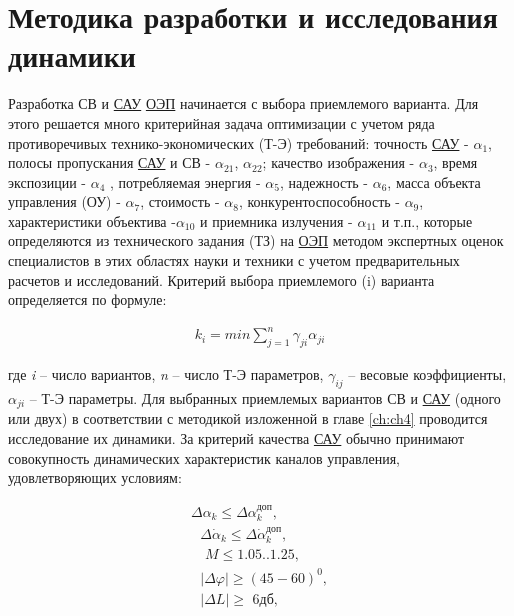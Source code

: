 \section{Методика разработки и исследования динамики} \label{sec:ch2/sec1-}


Разработка СВ и \hyperref[acroSAU]{САУ} \hyperref[acroEOS]{ОЭП} начинается с выбора приемлемого варианта. Для этого решается много критерийная задача оптимизации с учетом ряда противоречивых технико-экономических (Т-Э) требований: точность \hyperref[acroSAU]{САУ} - $\alpha_{1}$, полосы пропускания \hyperref[acroSAU]{САУ} и СВ - $\alpha_{21}$, $\alpha_{22}$; качество изображения - $\alpha_{3}$, время экспозиции - $\alpha_{4}$ , потребляемая энергия - $\alpha_{5}$, надежность - $\alpha_{6}$, масса объекта управления (ОУ) - $\alpha_{7}$, стоимость - $\alpha_{8}$, конкурентоспособность - $\alpha_{9}$, характеристики объектива -$\alpha_{10}$ и приемника излучения - $\alpha_{11}$ и т.п., которые определяются из технического задания (ТЗ) на \hyperref[acroEOS]{ОЭП} методом экспертных оценок специалистов в этих областях науки и техники с учетом предварительных расчетов и исследований. Критерий выбора приемлемого (i) варианта определяется по формуле:

\begin{equation}
\label{eq:p2:1}
\begin{alignedat}{2}
k_i=min\sum_{j=1}^n{\gamma _{ji}\alpha _{ji}}
\end{alignedat}
\end{equation}

где \textit{i} – число вариантов, \textit{n} – число Т-Э параметров, $\gamma_{ij}$ – весовые коэффициенты, $\alpha_{ji}$ – Т-Э параметры. Для выбранных приемлемых вариантов СВ и \hyperref[acroSAU]{САУ} (одного или двух) в соответствии с методикой изложенной в главе \ref{ch:ch4} проводится исследование их динамики. За критерий качества \hyperref[acroSAU]{САУ} обычно принимают совокупность динамических характеристик каналов управления, удовлетворяющих условиям:

\begin{equation}
\label{eq:p2:2}
\begin{alignedat}{2}
\varDelta \alpha _k\leqslant \varDelta \alpha _{k}^{\textit{доп}},
\\
\,\,\,\,\varDelta \dot{\alpha}_k\leqslant \varDelta \dot{\alpha}_{k}^{\textit{доп}},
\\
\,\,\,\,\,\,M\leqslant \text{1.05..1.25,}
\\
\,\,\,\,\left| \left. \varDelta \varphi \right| \right. \geqslant \left( 45-60 \right) ^0,
\\
\,\,\,\,\left| \left. \varDelta L \right|\geqslant \,\,\textit{6дб}, \right. 
\end{alignedat}
\end{equation}

